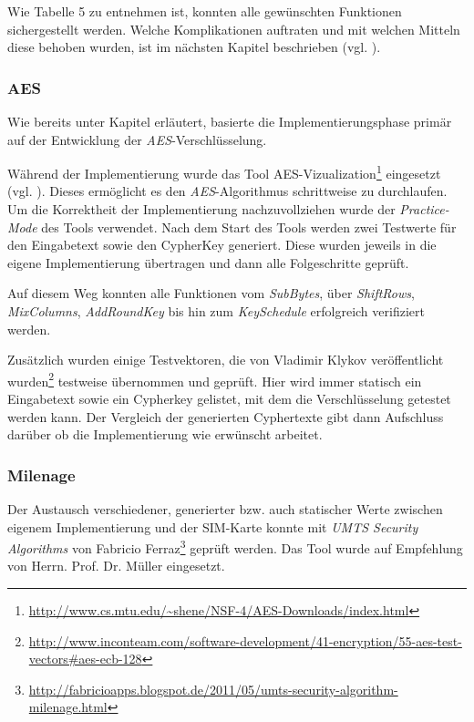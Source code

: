     Wie Tabelle 5 zu entnehmen ist, konnten alle gewünschten Funktionen sichergestellt werden.
    Welche Komplikationen auftraten und mit welchen Mitteln diese behoben wurden, ist im
    nächsten Kapitel beschrieben (vgl. ).


		\subsubsection{AES}
		Wie bereits unter Kapitel  erläutert, basierte die Implementierungsphase
		primär auf der Entwicklung der \textit{AES}-Verschlüsselung. 

		Während der Implementierung wurde das Tool AES-Vizualization\footnote{\url{http://www.cs.mtu.edu/~shene/NSF-4/AES-Downloads/index.html}} eingesetzt (vgl. ).
		Dieses ermöglicht es den \textit{AES}-Algorithmus schrittweise zu durchlaufen.
		Um die Korrektheit der Implementierung nachzuvollziehen wurde der \textit{Practice-Mode}
		des Tools verwendet. Nach dem Start des Tools werden zwei Testwerte für den
		Eingabetext sowie den CypherKey generiert. Diese wurden jeweils in die eigene
		Implementierung übertragen und dann alle Folgeschritte geprüft.

		Auf diesem Weg konnten alle Funktionen vom \textit{SubBytes}, über \textit{ShiftRows},
		\textit{MixColumns}, \textit{AddRoundKey} bis hin zum \textit{KeySchedule} erfolgreich verifiziert
		werden.

		Zusätzlich wurden einige Testvektoren, die von Vladimir Klykov veröffentlicht
		wurden\footnote{\url{http://www.inconteam.com/software-development/41-encryption/55-aes-test-vectors\#aes-ecb-128}}
		testweise übernommen und geprüft. Hier wird immer statisch ein Eingabetext sowie ein
		Cypherkey gelistet, mit dem die Verschlüsselung getestet werden kann. Der Vergleich
		der generierten Cyphertexte gibt dann Aufschluss darüber ob die Implementierung
		wie erwünscht arbeitet.


		\subsubsection{Milenage}
		Der Austausch verschiedener, generierter bzw. auch statischer Werte zwischen eigenem
		Implementierung und der SIM-Karte konnte mit \textit{UMTS Security Algorithms}
		von Fabricio Ferraz\footnote{\url{http://fabricioapps.blogspot.de/2011/05/umts-security-algorithm-milenage.html}}
		geprüft werden. Das Tool wurde auf Empfehlung von Herrn. Prof. Dr. Müller eingesetzt.

